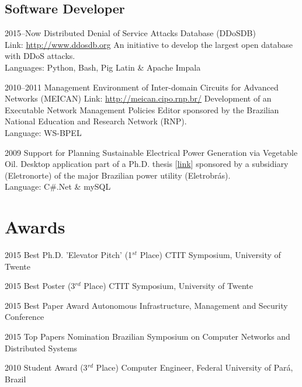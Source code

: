 \documentclass[print]{styles/friggeri-cv-mac} %
\begin{document}
\subsection{Software Developer}\vspace{-5pt}
\begin{entrylist}

\entry
{2015--Now}
{Distributed Denial of Service Attacks Database (DDoSDB)}
{\\Link: \href{http://ddosdb.org}{http://www.ddosdb.org} }
{An initiative to develop the largest open database with DDoS attacks.\\
Languages: Python, Bash, Pig Latin \& Apache Impala
}

\entry
{2010--2011}
{{Management Environment of Inter-domain Circuits for Advanced Networks (MEICAN)}}
{Link: \href{http://meican.cipo.rnp.br/}{http://meican.cipo.rnp.br/}}
{Development of an Executable Network Management Policies Editor sponsored by the Brazilian National Education and Research Network (RNP).    \\
Language: WS-BPEL
}

\entry
{2009}
{Support for Planning Sustainable Electrical Power Generation via Vegetable Oil.}
{}
{Desktop application part of a Ph.D. thesis [\href{https://sites.google.com/site/ceamazonufpa/TeseAnaRosaDuarte.pdf}{link}] sponsored by a subsidiary (Eletronorte) of the major Brazilian power utility (Eletrobrás).\\
Language: C\#.Net \& mySQL
}
\end{entrylist}

\section{Awards}\vspace{-5pt}

\begin{entrylist}
\vspace{-0.3cm}
\entry
{2015}
{Best Ph.D. 'Elevator Pitch' (1$^{st}$ Place)}
{CTIT Symposium, University of Twente}

\vspace{-0.3cm}
\entry
{2015}
{Best Poster (3$^{rd}$ Place)}
{CTIT Symposium, University of Twente}

\vspace{-0.3cm}
\entry
{2015}
{Best Paper Award}
{Autonomous Infrastructure, Management and Security Conference}

\vspace{-0.3cm}
\entry
{2015}
{Top Papers Nomination}
{Brazilian Symposium on Computer Networks and Distributed Systems}

\vspace{-0.3cm}
\entry
{2010}
{Student Award (3$^{rd}$ Place)}
{Computer Engineer, Federal University of Pará, Brazil}

\end{entrylist}
\end{document}
